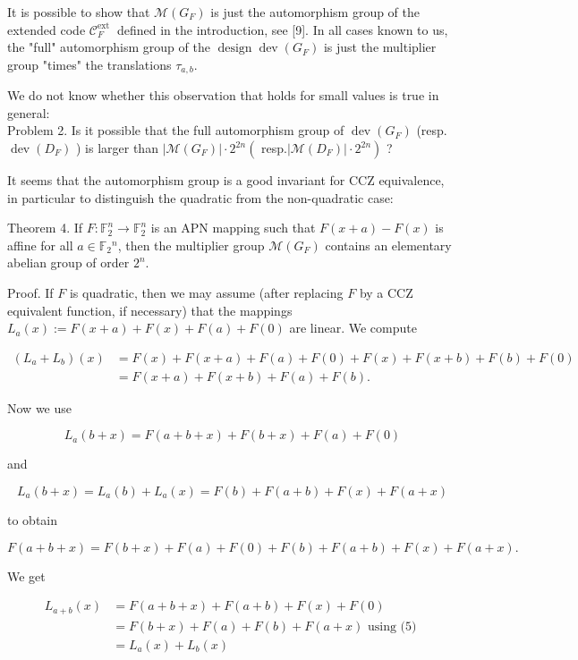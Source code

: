 \documentclass[10pt]{article}
\begin{document}
It is possible to show that $\mathcal{M}\left(G_{F}\right)$ is just the automorphism group of the extended code $\mathcal{C}_{F}^{\text {ext }}$ defined in the introduction, see [9]. In all cases known to us, the "full" automorphism group of the $\operatorname{design} \operatorname{dev}\left(G_{F}\right)$ is just the multiplier group "times" the translations $\tau_{a, b}$.

We do not know whether this observation that holds for small values is true in general:\\
Problem 2. Is it possible that the full automorphism group of $\operatorname{dev}\left(G_{F}\right)$ (resp. $\operatorname{dev}\left(D_{F}\right)$ ) is larger than $\left|\mathcal{M}\left(G_{F}\right)\right| \cdot 2^{2 n}\left(\right.$ resp.$\left.\left|\mathcal{M}\left(D_{F}\right)\right| \cdot 2^{2 n}\right)$ ?

It seems that the automorphism group is a good invariant for CCZ equivalence, in particular to distinguish the quadratic from the non-quadratic case:

Theorem 4. If $F: \mathbb{F}_{2}^{n} \rightarrow \mathbb{F}_{2}^{n}$ is an APN mapping such that $F(x+a)-F(x)$ is affine for all $a \in \mathbb{F}_{2}{ }^{n}$, then the multiplier group $\mathcal{M}\left(G_{F}\right)$ contains an elementary abelian group of order $2^{n}$.

Proof. If $F$ is quadratic, then we may assume (after replacing $F$ by a CCZ equivalent function, if necessary) that the mappings $L_{a}(x):=F(x+a)+F(x)+F(a)+F(0)$ are linear. We compute

$$
\begin{aligned}
\left(L_{a}+L_{b}\right)(x) & =F(x)+F(x+a)+F(a)+F(0)+F(x)+F(x+b)+F(b)+F(0) \\
& =F(x+a)+F(x+b)+F(a)+F(b) .
\end{aligned}
$$

Now we use

$$
L_{a}(b+x)=F(a+b+x)+F(b+x)+F(a)+F(0)
$$

and

$$
L_{a}(b+x)=L_{a}(b)+L_{a}(x)=F(b)+F(a+b)+F(x)+F(a+x)
$$

to obtain


\begin{equation*}
F(a+b+x)=F(b+x)+F(a)+F(0)+F(b)+F(a+b)+F(x)+F(a+x) . \tag{5}
\end{equation*}


We get

$$
\begin{aligned}
L_{a+b}(x) & =F(a+b+x)+F(a+b)+F(x)+F(0) \\
& =F(b+x)+F(a)+F(b)+F(a+x) \text { using (5) } \\
& =L_{a}(x)+L_{b}(x)
\end{aligned}
$$
\end{document}
